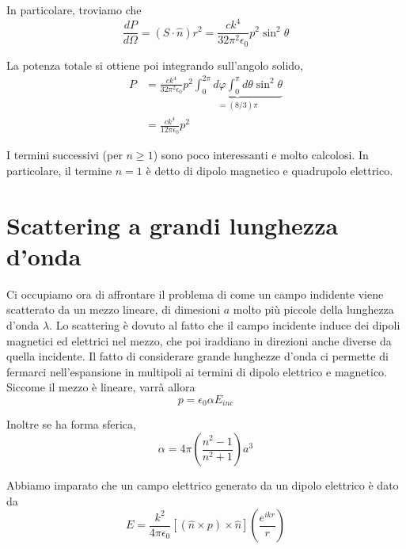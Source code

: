 \documentclass{report}
\begin{document}
            In particolare, troviamo che 
            \begin{equation}
                \frac{dP}{d\Omega} = (S\cdot \hat{n})r^2 = \frac{ck^4}{32\pi^2\epsilon_0}p^2\sin^2\theta
            \end{equation}

            La potenza totale si ottiene poi integrando sull'angolo solido, 
            \begin{align}
                P &= \frac{ck^4}{32\pi^2\epsilon_0}p^2\underbrace{\int_0^{2\pi} d\varphi \int_0^{\pi} d\theta \sin^2\theta}_{= (8/3)\pi} \\
                &= \frac{ck^4}{12\pi \epsilon_0}p^2
            \end{align}

            I termini successivi (per $n\geq 1$) sono poco interessanti e molto calcolosi. In particolare, il termine $n=1$ è detto di dipolo magnetico e quadrupolo elettrico. 

    \section{Scattering a grandi lunghezza d'onda}

    Ci occupiamo ora di affrontare il problema di come un campo indidente viene scatterato da un mezzo lineare, di dimesioni $a$ molto più piccole della lunghezza d'onda $\lambda$. Lo scattering è dovuto al fatto che il campo incidente induce dei dipoli magnetici ed elettrici nel mezzo, che poi iraddiano in direzioni anche diverse da quella incidente. Il fatto di considerare grande lunghezze d'onda ci permette di fermarci nell'espansione in multipoli ai termini di dipolo elettrico e magnetico. \\

    Siccome il mezzo è lineare, varrà allora 
    \begin{equation}
        p = \epsilon_0 \alpha E_{inc}
    \end{equation}

    Inoltre se ha forma sferica, 
    \begin{equation}
        \alpha = 4\pi \left(\frac{n^2-1}{n^2+1} \right)a^3
    \end{equation}

    Abbiamo imparato che un campo elettrico generato da un dipolo elettrico è dato da 
    \begin{equation}
        E = \frac{k^2}{4\pi\epsilon_0}[(\hat{n}\times p)\times \hat{n}]\left(\frac{e^{ikr}}{r} \right)
    \end{equation}
\end{document}
